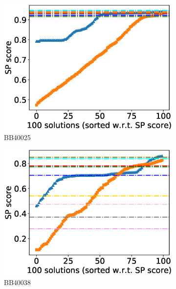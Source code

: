 \begin{figure}[!htbp]
\begin{adjustwidth}{-1cm}{-1cm}
\begin{subfigure}{0.22\textwidth}
			\includegraphics[width=\columnwidth]{Figure/summary/precomputedInit/Balibase/BB40025_pairs_density_single_run_2}
			\caption{BB40025}
		\end{subfigure}
		\begin{subfigure}{0.22\textwidth}
			\includegraphics[width=\columnwidth]{Figure/summary/precomputedInit/Balibase/BB40038_pairs_density_single_run_2}
			\caption{BB40038}
		\end{subfigure}
		\begin{subfigure}{0.22\textwidth}

\end{subfigure}
\end{adjustwidth}
\end{figure}
